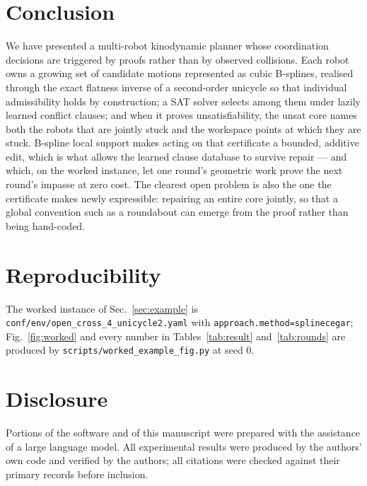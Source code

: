 \documentclass[conference]{IEEEtran}
\begin{document}
\section{Conclusion}

We have presented a multi-robot kinodynamic planner whose coordination decisions are
triggered by proofs rather than by observed collisions. Each robot owns a growing set of
candidate motions represented as cubic B-splines, realised through the exact flatness
inverse of a second-order unicycle so that individual admissibility holds by construction;
a SAT solver selects among them under lazily learned conflict clauses; and when it proves
unsatisfiability, the unsat core names both the robots that are jointly stuck and the
workspace points at which they are stuck. B-spline local support makes acting on that
certificate a bounded, additive edit, which is what allows the learned clause database to
survive repair --- and which, on the worked instance, let one round's geometric work prove
the next round's impasse at zero cost. The clearest open problem is also the one the
certificate makes newly expressible: repairing an entire core jointly, so that a global
convention such as a roundabout can emerge from the proof rather than being hand-coded.

\section*{Reproducibility}

The worked instance of Sec.~\ref{sec:example} is \texttt{conf/env/open\_cross\_4\_unicycle2.yaml}
with \texttt{approach.method=splinecegar}; Fig.~\ref{fig:worked} and every number in
Tables~\ref{tab:result} and~\ref{tab:rounds} are produced by
\texttt{scripts/worked\_example\_fig.py} at seed $0$.

\section*{Disclosure}

Portions of the software and of this manuscript were prepared with the assistance of a
large language model. All experimental results were produced by the authors' own code and
verified by the authors; all citations were checked against their primary records before
inclusion.



\end{document}
